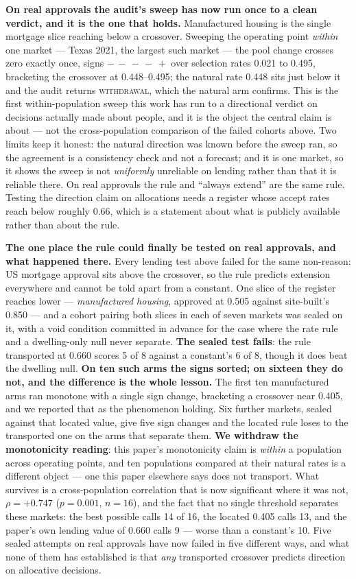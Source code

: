 \documentclass[conference]{IEEEtran}
\begin{document}
\textbf{On real approvals the audit's sweep has now run once to a clean verdict, and it is the
one that holds.} Manufactured housing is the single mortgage slice reaching below a crossover.
Sweeping the operating point \emph{within} one market --- Texas 2021, the largest such market
--- the pool change crosses zero exactly once, signs $-\,-\,-\,-\,+$ over selection rates
0.021 to 0.495, bracketing the crossover at 0.448--0.495; the natural rate 0.448 sits just
below it and the audit returns \textsc{withdrawal}, which the natural arm confirms. This is the
first within-population sweep this work has run to a directional verdict on decisions actually
made about people, and it is the object the central claim is about --- not the cross-population
comparison of the failed cohorts above. Two limits keep it honest: the natural direction was
known before the sweep ran, so the agreement is a consistency check and not a forecast; and it
is one market, so it shows the sweep is not \emph{uniformly} unreliable on lending rather than
that it is reliable there.
 On real approvals the rule and ``always extend'' are the same
rule. Testing the direction claim on allocations needs a register whose accept rates reach
below roughly 0.66, which is a statement about what is publicly available rather than about
the rule.

\textbf{The one place the rule could finally be tested on real approvals, and what
happened there.} Every lending test above failed for the same non-reason: US mortgage approval
sits above the crossover, so the rule predicts extension everywhere and cannot be told apart
from a constant. One slice of the register reaches lower --- \emph{manufactured housing},
approved at 0.505 against site-built's 0.850 --- and a cohort pairing both slices in each of
seven markets was sealed on it, with a void condition committed in advance for the case where
the rate rule and a dwelling-only null never separate. \textbf{The sealed test fails}: the rule
transported at 0.660 scores 5 of 8 against a constant's 6 of 8, though it does beat the
dwelling null. \textbf{On ten such arms the signs sorted; on sixteen they do not, and the difference is
the whole lesson.} The first ten manufactured arms ran monotone with a single sign change,
bracketing a crossover near 0.405, and we reported that as the phenomenon holding. Six further
markets, sealed against that located value, give five sign changes and the located rule loses
to the transported one on the arms that separate them. \textbf{We withdraw the monotonicity
reading}: this paper's monotonicity claim is \emph{within} a population across operating
points, and ten populations compared at their natural rates is a different object --- one this
paper elsewhere says does not transport. What survives is a cross-population correlation that
is now significant where it was not, $\rho = +0.747$ ($p = 0.001$, $n = 16$), and the fact
that no single threshold separates these markets: the best possible calls 14 of 16, the
located 0.405 calls 13, and the paper's own lending value of 0.660 calls 9 --- worse than a
constant's 10. Five sealed attempts on real approvals have now failed in five different ways,
and what none of them has established is that \emph{any} transported crossover predicts
direction on allocative decisions.
\end{document}
